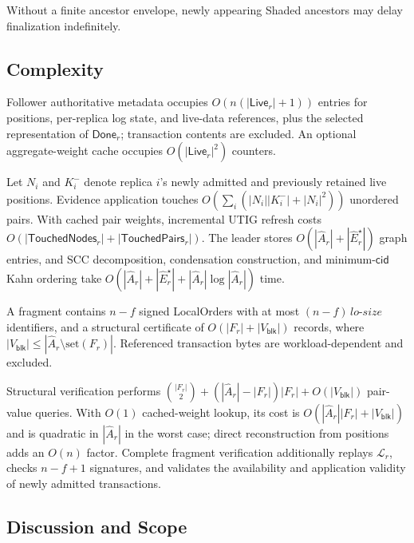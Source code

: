 Without a finite ancestor envelope, newly appearing Shaded ancestors may
delay finalization indefinitely.

\subsection{Complexity}
\label{sec:complexity}

Follower authoritative metadata occupies
$O(n(|\mathsf{Live}_r|+1))$ entries for positions, per-replica log state, and
live-data references, plus the selected representation of $\mathsf{Done}_r$;
transaction contents are excluded.  An optional aggregate-weight cache
occupies $O(|\mathsf{Live}_r|^2)$ counters.

Let $N_i$ and $K_i^-$ denote replica $i$'s newly admitted and previously
retained live positions.  Evidence application touches
$O(\sum_i(|N_i||K_i^-|+|N_i|^2))$ unordered pairs.  With cached pair weights,
incremental UTIG refresh costs
$O(|\mathsf{TouchedNodes}_r|+|\mathsf{TouchedPairs}_r|)$.  The leader stores
$O(|\widehat A_r|+|\widehat E_r^\star|)$ graph entries, and SCC decomposition,
condensation construction, and minimum-$\mathsf{cid}$ Kahn ordering take
$O(|\widehat A_r|+|\widehat E_r^\star|
  +|\widehat A_r|\log|\widehat A_r|)$ time.

A fragment contains $n-f$ signed LocalOrders with at most
$(n-f)\,lo\text{-}size$ identifiers, and a structural certificate of
$O(|F_r|+|V_{\mathsf{blk}}|)$ records, where
$|V_{\mathsf{blk}}|\le|\widehat A_r\setminus\mathrm{set}(F_r)|$.
Referenced transaction bytes are workload-dependent and excluded.

Structural verification performs
$\binom{|F_r|}{2}+(|\widehat A_r|-|F_r|)|F_r|
 +O(|V_{\mathsf{blk}}|)$ pair-value queries.  With $O(1)$ cached-weight
lookup, its cost is $O(|\widehat A_r||F_r|+|V_{\mathsf{blk}}|)$ and is
quadratic in $|\widehat A_r|$ in the worst case; direct reconstruction from
positions adds an $O(n)$ factor.  Complete fragment verification additionally
replays $\mathcal L_r$, checks $n-f+1$ signatures, and validates the
availability and application validity of newly admitted transactions.

\subsection{Discussion and Scope}
\label{sec:discussion-scope}

